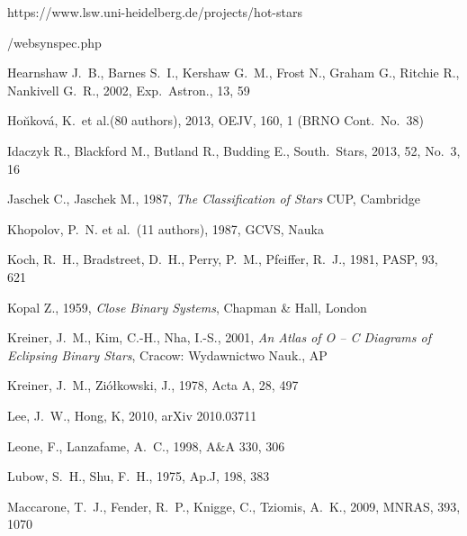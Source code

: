 \documentclass[useAMS,usenatbib]{mnras}                                                                           \usepackage[pdftex]{graphicx}
\begin{document}
\begin{thebibliography}{}
{\footnotesize https://www.lsw.uni-heidelberg.de/projects/hot-stars 

/websynspec.php}

Hearnshaw J.\ B., Barnes S.\ I., Kershaw G.\ M., Frost N., Graham G., 
Ritchie R., Nankivell G.\ R., 
 2002, Exp.\ Astron., {13}, 59 


 Ho\u{n}kov\'{a}, K.\ et al.(80 authors), 2013, OEJV, 160, 1 (BRNO Cont.\ No.\ 38)

Idaczyk R., Blackford M., Butland R., Budding E.,   
South.\ Stars, 2013, 52, No.\ 3, 16

Jaschek C., Jaschek M., 1987, {\em The Classification of Stars} CUP, Cambridge

Khopolov, P.\ N. et al.\ (11 authors), 1987, GCVS, Nauka 

Koch, R.\ H., Bradstreet, D.\ H., Perry, P.\ M., Pfeiffer, R.\ J., 1981, PASP, 93, 621

Kopal Z., 1959, {\em Close Binary Systems}, Chapman \& Hall, London

Kreiner, J.\ M., Kim, C.-H., Nha, I.-S., 2001,
{\em An Atlas of O -- C Diagrams of Eclipsing Binary Stars}, 
 Cracow: Wydawnictwo Nauk., AP
 
Kreiner, J.\ M., Zi\'{o}{\l}kowski, J., 1978, Acta A, 28, 497

Lee, J.\ W., Hong, K, 2010, arXiv 2010.03711

 Leone, F., Lanzafame, A.\ C., 1998,  A{\&}A 330, 306
 
Lubow, S.\ H., Shu, F.\ H., 1975, Ap.J, 198, 383

Maccarone, T.\ J., Fender, R.\ P., Knigge, C.,  Tziomis, A.\ K.,  2009, MNRAS, 393, 1070


\end{thebibliography}
\end{document}
